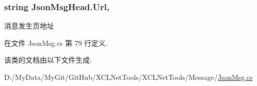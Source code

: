 \hypertarget{class_json_msg_head_a14b84be17a2783df2316a221318cb9f2}{
\subsubsection[{Url}]{\setlength{\rightskip}{0pt plus 5cm}string Json\-Msg\-Head.\-Url\hspace{0.3cm}{\ttfamily [get]}, {\ttfamily [set]}}}\label{class_json_msg_head_a14b84be17a2783df2316a221318cb9f2}


消息发生页地址 



在文件 Json\-Msg.\-cs 第 79 行定义.



该类的文档由以下文件生成\-:\begin{DoxyCompactItemize}
\item 
D\-:/\-My\-Data/\-My\-Git/\-Git\-Hub/\-X\-C\-L\-Net\-Tools/\-X\-C\-L\-Net\-Tools/\-Message/\hyperlink{_json_msg_8cs}{Json\-Msg.\-cs}\end{DoxyCompactItemize}
